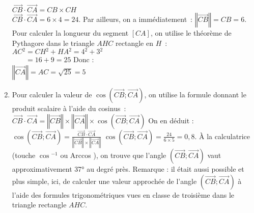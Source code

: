 \begin{corrige}
\begin{enumerate}
          $\overrightarrow{CB}  \cdot \overrightarrow{CA} =CB \times CH$\\
          $\overrightarrow{CB}  \cdot \overrightarrow{CA} =6 \times 4=24.$
          \medbreak
          Par ailleurs, on a immédiatement~:
          \newpar
          $\left\Vert \overrightarrow{CB} \right\Vert =CB=6.$
          \medbreak
          Pour calculer la longueur du segment $[CA] $, on utilise le théorème de Pythagore dans le triangle $AHC$ rectangle en $H$~:
          \newpar
          $AC{}^2 =CH{}^2 +HA{}^2 =4{}^2 +3{}^2 $\\
          $\phantom{AC{}^2 }=16+9=25$
          \newpar
          Donc :\\
          $ \left\Vert \overrightarrow{CA} \right\Vert =AC=\sqrt{25} = 5$
          \item
          Pour calculer la valeur de  $ \cos\left( \overrightarrow{CB} ;\overrightarrow{CA}  \right) $, on utilise la formule donnant le produit scalaire à l'aide du cosinus~:
          \newpar
          $\overrightarrow{CB}  \cdot \overrightarrow{CA} = \left\Vert \overrightarrow{CB} \right\Vert  \times \left\Vert \overrightarrow{CA} \right\Vert  \times \cos\left( \overrightarrow{CB} ;\overrightarrow{CA}  \right)$
          \newpar
          On en déduit :
          \newpar
          $\cos\left( \overrightarrow{CB} ;\overrightarrow{CA}  \right) = \frac{\overrightarrow{CB}  \cdot \overrightarrow{CA} }{ \left\Vert \overrightarrow{CB} \right\Vert  \times \left\Vert \overrightarrow{CA} \right\Vert } $
          \newpar
          $\cos\left( \overrightarrow{CB} ;\overrightarrow{CA}  \right) =\frac{24}{6 \times 5} =0,8.$
          \medbreak
          À la calculatrice (touche \og $\cos{}^{ - 1}$  \fg{}  ou \og Arccos \fg{} ), on trouve que l'angle $\left( \overrightarrow{CB} ;\overrightarrow{CA}  \right)$ vaut approximativement 37° au degré près.
          \medbreak
          Remarque : il était aussi possible et plus simple, ici, de calculer une valeur approchée de l'angle $\left( \overrightarrow{CB} ;\overrightarrow{CA}  \right)$ à l'aide des formules trigonométriques vues en classe de troisième dans le triangle rectangle $AHC$.
     \end{enumerate}
\end{corrige}
